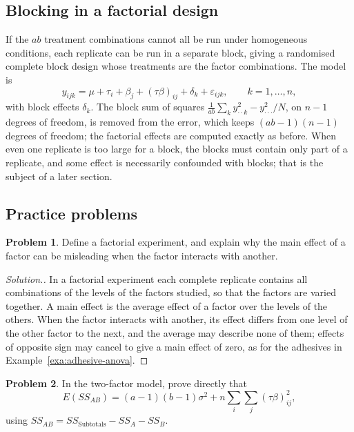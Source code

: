 \documentclass[11pt,a4paper]{article}
\numberwithin{equation}{section}
\theoremstyle{definition}
\newtheorem{problemx}{Problem}[subsection]
\newenvironment{problem}{\begin{problemx}}{\end{problemx}}
\newenvironment{solution}
  {\renewcommand{\qedsymbol}{}\begin{proof}[\textit{Solution}.]}
  {\end{proof}}
\begin{document}
\subsection{Blocking in a factorial design}
If the $ab$ treatment combinations cannot all be run under homogeneous conditions, each replicate can be run in a separate block, giving a
randomised complete block design whose treatments are the factor combinations. The model is
\[
y_{ijk} = \mu + \tau_i + \beta_j + (\tau\beta)_{ij} + \delta_k + \varepsilon_{ijk} , \qquad k = 1, \dots, n ,
\]
with block effects $\delta_k$. The block sum of squares $\frac{1}{ab}\sum_ky_{\cdot\cdot k}^2 - y_{\cdot\cdot\cdot}^2/N$, on $n - 1$ degrees of freedom, is removed from the error, which keeps $(ab - 1)(n - 1)$
degrees of freedom; the factorial effects are computed exactly as before. When even one replicate is too large for a block, the blocks must
contain only part of a replicate, and some effect is necessarily confounded with blocks; that is the subject of a later section.

\subsection{Practice problems}

\begin{problem}
Define a factorial experiment, and explain why the main effect of a factor can be misleading when the factor interacts with another.
\end{problem}

\begin{solution}
In a factorial experiment each complete replicate contains all combinations of the levels of the factors studied, so that the factors
are varied together. A main effect is the average effect of a factor over the levels of the others. When the factor interacts with another, its
effect differs from one level of the other factor to the next, and the average may describe none of them; effects of opposite sign may cancel to
give a main effect of zero, as for the adhesives in Example~\ref{exa:adhesive-anova}.
\end{solution}

\begin{problem}
In the two-factor model, prove directly that
\[
E(SS_{AB}) = (a - 1)(b - 1)\sigma^2 + n\sum_i\sum_j(\tau\beta)_{ij}^2 ,
\]
using $SS_{AB} = SS_{\mathrm{Subtotals}} - SS_A - SS_B$.
\end{problem}
\end{document}
